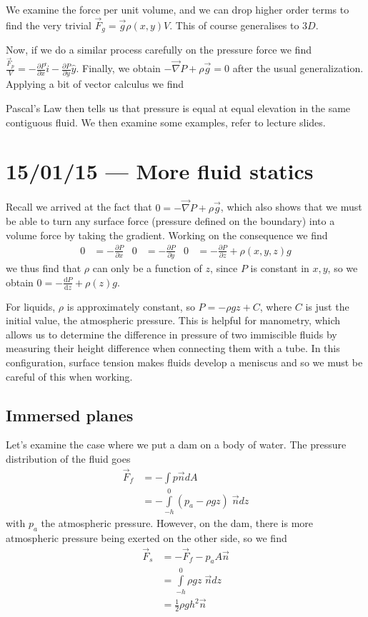 \documentclass[10pt]{report}
\newcommand{\rd}[2]{\frac{\mathrm{d}#1}{\mathrm{d}#2}}
\newcommand{\pd}[2]{\frac{\partial #1}{\partial#2}}
\begin{document}
We examine the force per unit volume, and we can drop higher order terms to find the very trivial $\vec{F}_g = \vec{g}\rho(x,y) V$. This of course generalises to $3D$.

Now, if we do a similar process carefully on the pressure force we find $\frac{\vec{F}_p}{V} = -\pd{P}{x}\hat{i} - \pd{P}{y}\hat{y}$. Finally, we obtain $-\vec{\nabla}P + \rho \vec{g} = 0$ after the usual generalization. Applying a bit of vector calculus we find

Pascal's Law then tells us that pressure is equal at equal elevation in the same contiguous fluid. We then examine some examples, refer to lecture slides.

\chapter{15/01/15 --- More fluid statics}

Recall we arrived at the fact that $0 = -\vec{\nabla}P + \rho \vec{g}$, which also shows that we must be able to turn any surface force (pressure defined on the boundary) into a volume force by taking the gradient. Working on the consequence we find
\begin{align}
    0 &= -\pd{P}{x} & 0 &= -\pd{P}{y} & 0 &= -\pd{P}{z} + \rho(x,y,z)g
\end{align}
we thus find that $\rho$ can only be a function of $z$, since $P$ is constant in $x,y$, so we obtain $0 = -\rd{P}{z} + \rho(z)g$. 

For liquids, $\rho$ is approximately constant, so $P = -\rho gz + C$, where $C$ is just the initial value, the atmospheric pressure. This is helpful for manometry, which allows us to determine the difference in pressure of two immiscible fluids by measuring their height difference when connecting them with a tube. In this configuration, surface tension makes fluids develop a meniscus and so we must be careful of this when working.

\section{Immersed planes}

Let's examine the case where we put a dam on a body of water. The pressure distribution of the fluid goes
\begin{align}
    \vec{F}_f &= -\int p\vec{n} dA\\
    &= -\int\limits_{-h}^{0}(p_a - \rho gz)\;\vec{n}dz
\end{align}
with $p_a$ the atmospheric pressure. However, on the dam, there is more atmospheric pressure being exerted on the other side, so we find
\begin{align}
    \vec{F}_s &= -\vec{F}_f - p_a A\vec{n}\\
    &= \int\limits_{-h}^{0}\rho gz\;\vec{n}dz\\
    &= \frac{1}{2}\rho gh^2\vec{n}
\end{align}
\end{document}
